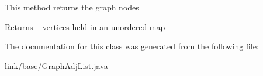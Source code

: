 This method returns the graph nodes

\begin{DoxyReturn}{Returns}
-- vertices held in an unordered map 
\end{DoxyReturn}


The documentation for this class was generated from the following file\+:\begin{DoxyCompactItemize}
\item 
link/base/\hyperlink{_graph_adj_list_8java}{Graph\+Adj\+List.\+java}\end{DoxyCompactItemize}

